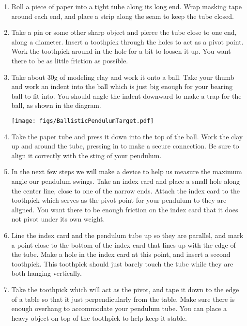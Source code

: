     \begin{enumerate}
        \item Roll a piece of paper into a tight tube along its long end. Wrap masking tape around each end, and place a strip along the seam to keep the tube closed.
        \item Take a pin or some other sharp object and pierce the tube close to one end, along a diameter.  Insert a toothpick through the holes to act as a pivot point.  Work the toothpick around in the hole for a bit to loosen it up. You want there to be as little friction as possible.
        \item Take about 30g of modeling clay and work it onto a ball.  Take your thumb and work an indent into the ball which is just big enough for your bearing ball to fit into.  You should angle the indent downward to make a trap for the ball, as shown in the diagram.

        \texttt{[image: figs/BallisticPendulumTarget.pdf]}

        \item Take the paper tube and press it down into the top of the ball. Work the clay up and around the tube, pressing in to make a secure connection. Be sure to align it correctly with the sting of your pendulum.
        \item In the next few steps we will make a device to help us measure the maximum angle our pendulum swings. Take an index card and place a small hole along the center line, close to one of the narrow ends.  Attach the index card to the toothpick which serves as the pivot point for your pendulum to they are aligned. You want there to be enough friction on the index card that it does not pivot under its own weight.
        \item Line the index card and the pendulum tube up so they are parallel, and mark a point close to the bottom of the index card that lines up with the edge of the tube.  Make a hole in the index card at this point, and insert a second toothpick. This toothpick should just barely touch the tube while they are both hanging vertically.
        \item Take the toothpick which will act as the pivot, and tape it down to the edge of a table so that it just perpendicularly from the table. Make sure there is enough overhang to accommodate your pendulum tube.  You can place a heavy object on top of the toothpick to help keep it stable.

    \end{enumerate}

